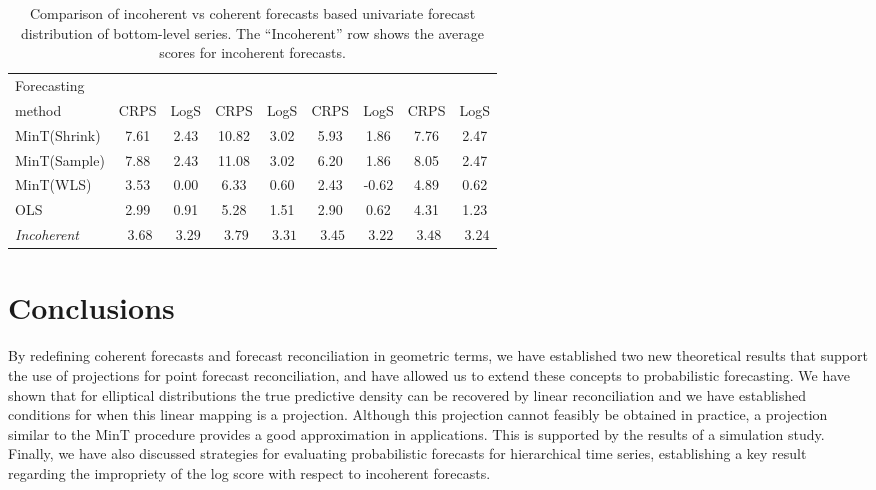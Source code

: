 \documentclass[a4paper, 11pt]{article}
\def\mathbi#1{\textit{ #1}}
\theoremstyle{definition}
\begin{document}
\begin{table}
	\caption{Comparison of incoherent vs coherent forecasts based univariate forecast distribution of bottom-level series. The ``Incoherent'' row shows the average scores for incoherent forecasts.}\label{table:5}
	\centering\tabcolsep=0.08cm\small
	\begin{tabular}{@{}lSSSSSSSS@{}}
		\toprule
		Forecasting &
		 &
		 &
		 &
		 \\
		\cmidrule(lr){2-3} \cmidrule(lr){4-5} \cmidrule(lr){6-7} \cmidrule(l){8-9}
		method       & CRPS   & LogS    & CRPS   & LogS    & CRPS   & LogS    & CRPS   & LogS \\
		\midrule
		MinT(Shrink) &  7.61  &  2.43  &  10.82  &  3.02  &  5.93  &  1.86  &  7.76  & 2.47  \\
		MinT(Sample) &  7.88  &  2.43  &  11.08  &  3.02  &  6.20  &  1.86  &  8.05  & 2.47  \\
		MinT(WLS)    &  3.53  &  0.00  &   6.33  &  0.60  &  2.43  & -0.62  &  4.89  & 0.62  \\
		OLS          &  2.99  &  0.91  &   5.28  &  1.51  &  2.90  &  0.62  &  4.31  & 1.23  \\
		\midrule
		\textit{Incoherent} & $\mathbi{3.68}$ & $\mathbi{3.29}$ & $\mathbi{3.79}$ & $\mathbi{3.31}$ & $\mathbi{3.45}$ & $\mathbi{3.22}$ & $\mathbi{3.48}$ & $\mathbi{3.24}$ \\
		\bottomrule
	\end{tabular}
\end{table}

\section{Conclusions}\label{sec:conclusions}


By redefining coherent forecasts and forecast reconciliation in geometric terms, we have established two new theoretical results that support the use of projections for point forecast reconciliation, and have allowed us to extend these concepts to probabilistic forecasting. We have shown that for elliptical distributions the true predictive density can be recovered by linear reconciliation and we have established conditions for when this linear mapping is a projection. Although this projection cannot feasibly be obtained in practice, a projection similar to the MinT procedure provides a good approximation in applications. This is supported by the results of a simulation study. Finally, we have also discussed strategies for evaluating probabilistic forecasts for hierarchical time series, establishing a key result regarding the impropriety of the log score with respect to incoherent forecasts.
\end{document}
